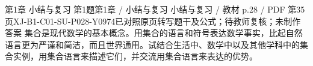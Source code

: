 \par\noindent\begin{minipage}{\linewidth}
\begin{bankitem}{第1章 小结与复习 第1题}{第1章 / 小结与复习 小结与复习 / 教材 p.28 / PDF 第35页}{XJ-B1-C01-SU-P028-Y0974}{已对照原页转写题干及公式；待教师复核；未制作答案}
集合是现代数学的基本概念。用集合的语言和符号表达数学事实，比起自然语言更为严谨和简洁，而且世界通用。试结合生活中、数学中以及其他学科中的集合实例，用集合语言来描述它们，并交流用集合语言来表达的优势。
\end{bankitem}
\end{minipage}\par\medskip
